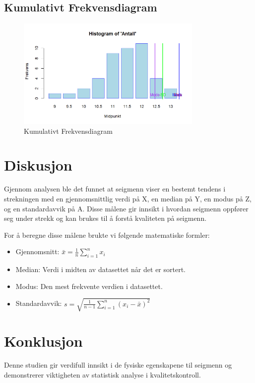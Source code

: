 \documentclass{article}
\begin{document}
\subsection{Kumulativt Frekvensdiagram}
\begin{figure}[H]
    \centering
    \includegraphics[width=0.8\textwidth]{Rplot02.png}
    \caption{Kumulativt Frekvensdiagram}
\end{figure}

\section{Diskusjon}
Gjennom analysen ble det funnet at seigmenn viser en bestemt tendens i strekningen med en gjennomsnittlig verdi på X, en median på Y, en modus på Z, og en standardavvik på A. Disse målene gir innsikt i hvordan seigmenn oppfører seg under strekk og kan brukes til å forstå kvaliteten på seigmenn.

For å beregne disse målene brukte vi følgende matematiske formler:
\begin{itemize}
    \item Gjennomsnitt: $\bar{x} = \frac{1}{n}\sum_{i=1}^{n} x_i$
    \item Median: Verdi i midten av datasettet når det er sortert.
    \item Modus: Den mest frekvente verdien i datasettet.
    \item Standardavvik: $s = \sqrt{\frac{1}{n-1}\sum_{i=1}^{n}(x_i - \bar{x})^2}$
\end{itemize}

\section{Konklusjon}
Denne studien gir verdifull innsikt i de fysiske egenskapene til seigmenn og demonstrerer viktigheten av statistisk analyse i kvalitetskontroll.
\end{document}
